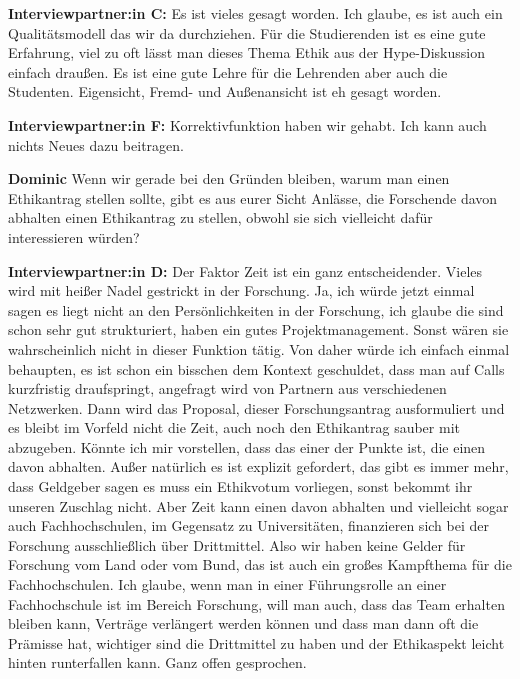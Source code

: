\documentclass[a4paper,12pt,twoside]{scrreprt}
\begin{document}
\textbf{Interviewpartner:in C:} Es ist vieles gesagt worden. Ich glaube, es ist auch ein Qualitätsmodell das wir da durchziehen. Für die Studierenden ist es eine gute Erfahrung, viel zu oft lässt man dieses Thema Ethik aus der Hype-Diskussion einfach draußen. Es ist eine gute Lehre für die Lehrenden aber auch die Studenten. Eigensicht, Fremd- und Außenansicht ist eh gesagt worden.

\textbf{Interviewpartner:in F:} Korrektivfunktion haben wir gehabt. Ich kann auch nichts Neues dazu beitragen.

\textbf{Dominic} Wenn wir gerade bei den Gründen bleiben, warum man einen Ethikantrag stellen sollte, gibt es aus eurer Sicht Anlässe, die Forschende davon abhalten einen Ethikantrag zu stellen, obwohl sie sich vielleicht dafür interessieren würden?

\textbf{Interviewpartner:in D:} Der Faktor Zeit ist ein ganz entscheidender. Vieles wird mit heißer Nadel gestrickt in der Forschung. Ja, ich würde jetzt einmal sagen es liegt nicht an den Persönlichkeiten in der Forschung, ich glaube die sind schon sehr gut strukturiert, haben ein gutes Projektmanagement. Sonst wären sie wahrscheinlich nicht in dieser Funktion tätig. Von daher würde ich einfach einmal behaupten, es ist schon ein bisschen dem Kontext geschuldet, dass man auf Calls kurzfristig draufspringt, angefragt wird von Partnern aus verschiedenen Netzwerken. Dann wird das Proposal, dieser Forschungsantrag ausformuliert und es bleibt im Vorfeld nicht die Zeit, auch noch den Ethikantrag sauber mit abzugeben. Könnte ich mir vorstellen, dass das einer der Punkte ist, die einen davon abhalten. Außer natürlich es ist explizit gefordert, das gibt es immer mehr, dass Geldgeber sagen es muss ein Ethikvotum vorliegen, sonst bekommt ihr unseren Zuschlag nicht. Aber Zeit kann einen davon abhalten und vielleicht sogar auch Fachhochschulen, im Gegensatz zu Universitäten, finanzieren sich bei der Forschung ausschließlich über Drittmittel. Also wir haben keine Gelder für Forschung vom Land oder vom Bund, das ist auch ein großes Kampfthema für die Fachhochschulen. Ich glaube, wenn man in einer Führungsrolle an einer Fachhochschule ist im Bereich Forschung, will man auch, dass das Team erhalten bleiben kann, Verträge verlängert werden können und dass man dann oft die Prämisse hat, wichtiger sind die Drittmittel zu haben und der Ethikaspekt leicht hinten runterfallen kann. Ganz offen gesprochen.
\end{document}
